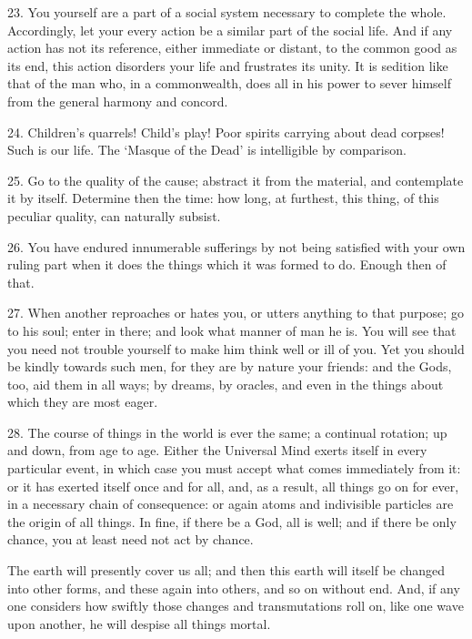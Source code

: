 \documentclass{book}
\begin{document}
23. You yourself are a part of a social system necessary to complete
the whole. Accordingly, let your every action be a similar part of the
social life. And if any action has not its reference, either immediate
or distant, to the common good as its end, this action disorders your
life and frustrates its unity. It is sedition like that of the man
who, in a commonwealth, does all in his power to sever himself from
the general harmony and concord.

24. Children's quarrels! Child's play! Poor spirits carrying about
dead corpses! Such is our life. The `Masque of the Dead' is
intelligible by comparison.

25. Go to the quality of the cause; abstract it from the material, and
contemplate it by itself. Determine then the time: how long, at
furthest, this thing, of this peculiar quality, can naturally subsist.

26. You have endured innumerable sufferings by not being satisfied
with your own ruling part when it does the things which it was formed
to do. Enough then of that.

27. When another reproaches or hates you, or utters anything to that
purpose; go to his soul; enter in there; and look what manner of man
he is. You will see that you need not trouble yourself to make him
think well or ill of you. Yet you should be kindly towards such men,
for they are by nature your friends: and the Gods, too, aid them in
all ways; by dreams, by oracles, and even in the things about which
they are most eager.

28. The course of things in the world is ever the same; a continual
rotation; up and down, from age to age. Either the Universal Mind
exerts itself in every particular event, in which case you must accept
what comes immediately from it: or it has exerted itself once and for
all, and, as a result, all things go on for ever, in a necessary chain
of consequence: or again atoms and indivisible particles are the
origin of all things. In fine, if there be a God, all is well; and if
there be only chance, you at least need not act by chance.

The earth will presently cover us all; and then this earth will itself
be changed into other forms, and these again into others, and so on
without end. And, if any one considers how swiftly those changes and
transmutations roll on, like one wave upon another, he will despise
all things mortal.
\end{document}
